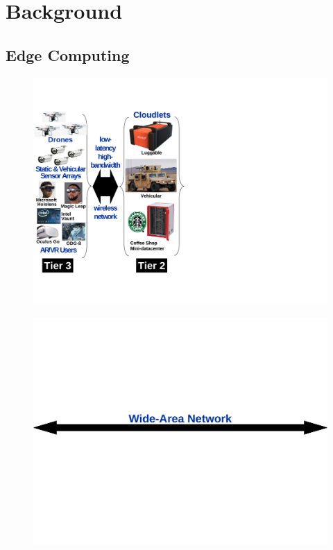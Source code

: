 \chapter{Background}
\label{chapter: background}

\section{Edge Computing}

\begin{figure}[t]
\begin{minipage}[b]{4.3in}
\begin{minipage}[c]{1.68in}
\includegraphics[scale=0.3]{FIGS/fig-3tier-A.pdf}
\end{minipage}
\begin{minipage}[c]{1.75in}
\vspace{0.01in}
\includegraphics[scale=0.16]{FIGS/fig-3tier-B-cropped.pdf}\\

\end{minipage}
\end{minipage}
\end{figure}
